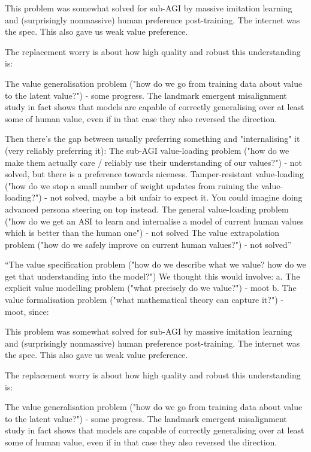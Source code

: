 \documentclass[11pt]{article}
\begin{document}
This problem was somewhat solved for sub-AGI by massive imitation learning and (surprisingly nonmassive) human preference post-training. The internet was the spec. This also gave us weak value preference.

The replacement worry is about how high quality and robust this understanding is:

The value generalisation problem ("how do we go from training data about value to the latent value?") - some progress. The landmark emergent misalignment study in fact shows that models are capable of correctly generalising over at least some of human value, even if in that case they also reversed the direction.

Then there's the gap between usually preferring something and "internalising" it (very reliably preferring it):
The sub-AGI value-loading problem ("how do we make them actually care / reliably use their understanding of our values?") - not solved, but there is a preference towards niceness.
Tamper-resistant value-loading ("how do we stop a small number of weight updates from ruining the value-loading?") - not solved, maybe a bit unfair to expect it. You could imagine doing advanced persona steering on top instead.
The general value-loading problem ("how do we get an ASI to learn and internalise a model of current human values which is better than the human one") - not solved
The value extrapolation problem ("how do we safely improve on current human values?") - not solved''

``The value specification problem ("how do we describe what we value? how do we get that understanding into the model?")
We thought this would involve:
a. The explicit value modelling problem ("what precisely do we value?") - moot
b. The value formalisation problem ("what mathematical theory can capture it?") - moot, since:

This problem was somewhat solved for sub-AGI by massive imitation learning and (surprisingly nonmassive) human preference post-training. The internet was the spec. This also gave us weak value preference.

The replacement worry is about how high quality and robust this understanding is:

The value generalisation problem ("how do we go from training data about value to the latent value?") - some progress. The landmark emergent misalignment study in fact shows that models are capable of correctly generalising over at least some of human value, even if in that case they also reversed the direction. 
\end{document}
